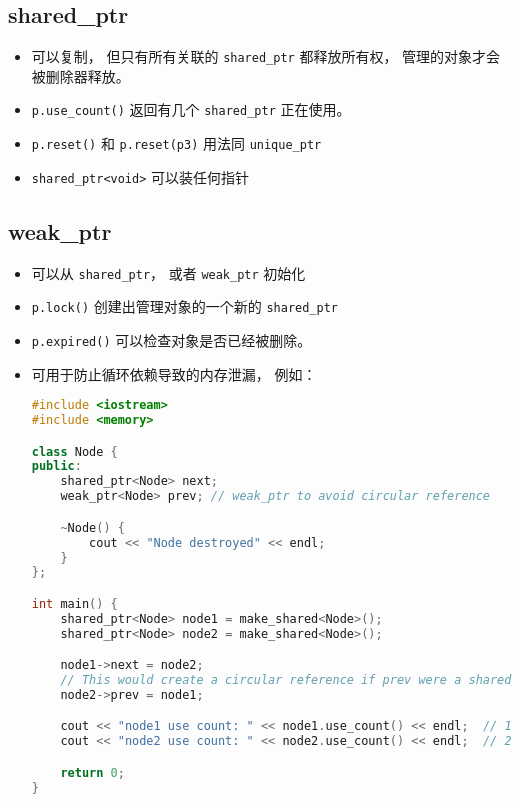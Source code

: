 \subsection{shared\_ptr}
\begin{itemize}
\item 可以复制， 但只有所有关联的 \verb`shared_ptr` 都释放所有权， 管理的对象才会被删除器释放。
\item \verb`p.use_count()` 返回有几个 \verb`shared_ptr` 正在使用。
\item \verb`p.reset()` 和 \verb`p.reset(p3)` 用法同 \verb`unique_ptr`
\item \verb`shared_ptr<void>` 可以装任何指针
\end{itemize}

\subsection{weak\_ptr}
\begin{itemize}
\item 可以从 \verb`shared_ptr`， 或者 \verb`weak_ptr` 初始化
\item \verb`p.lock()` 创建出管理对象的一个新的 \verb`shared_ptr`
\item \verb`p.expired()` 可以检查对象是否已经被删除。
\item 可用于防止循环依赖导致的内存泄漏， 例如：
\begin{lstlisting}[language=cpp]
#include <iostream>
#include <memory>

class Node {
public:
    shared_ptr<Node> next;
    weak_ptr<Node> prev; // weak_ptr to avoid circular reference

    ~Node() {
        cout << "Node destroyed" << endl;
    }
};

int main() {
    shared_ptr<Node> node1 = make_shared<Node>();
    shared_ptr<Node> node2 = make_shared<Node>();

    node1->next = node2;
    // This would create a circular reference if prev were a shared_ptr
    node2->prev = node1;

    cout << "node1 use count: " << node1.use_count() << endl;  // 1
    cout << "node2 use count: " << node2.use_count() << endl;  // 2

    return 0;
}
\end{lstlisting}
\end{itemize}
